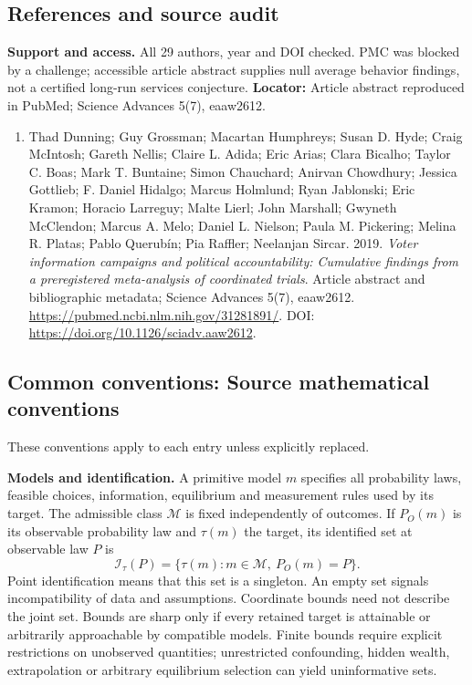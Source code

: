 \documentclass[11pt,a4paper]{article}
\begin{document}
\subsection*{References and source audit}
\textbf{Support and access.} All 29 authors, year and DOI checked. PMC was blocked by a challenge; accessible article abstract supplies null average behavior findings, not a certified long-run services conjecture. \textbf{Locator:} Article abstract reproduced in PubMed; Science Advances 5(7), eaaw2612.
\begin{enumerate}\raggedright
\item\hypertarget{definitions:source:30007669:1}{} Thad Dunning; Guy Grossman; Macartan Humphreys; Susan D. Hyde; Craig McIntosh; Gareth Nellis; Claire L. Adida; Eric Arias; Clara Bicalho; Taylor C. Boas; Mark T. Buntaine; Simon Chauchard; Anirvan Chowdhury; Jessica Gottlieb; F. Daniel Hidalgo; Marcus Holmlund; Ryan Jablonski; Eric Kramon; Horacio Larreguy; Malte Lierl; John Marshall; Gwyneth McClendon; Marcus A. Melo; Daniel L. Nielson; Paula M. Pickering; Melina R. Platas; Pablo Querubín; Pia Raffler; Neelanjan Sircar. 2019. \emph{Voter information campaigns and political accountability: Cumulative findings from a preregistered meta-analysis of coordinated trials}. Article abstract and bibliographic metadata; Science Advances 5(7), eaaw2612.
\url{https://pubmed.ncbi.nlm.nih.gov/31281891/}.
DOI: \url{https://doi.org/10.1126/sciadv.aaw2612}.
\end{enumerate}

\subsection*{Common conventions: Source mathematical conventions}

These conventions apply to each entry unless explicitly replaced.

\textbf{Models and identification.} A primitive model \(m\) specifies all probability laws, feasible choices, information, equilibrium and measurement rules used by its target. The admissible class \(\mathcal M\) is fixed independently of outcomes. If \(P_O(m)\) is its observable probability law and \(\tau(m)\) the target, its identified set at observable law \(P\) is
\[
 \mathcal I_\tau(P)=\{\tau(m):m\in\mathcal M,\ P_O(m)=P\}.
\]
Point identification means that this set is a singleton. An empty set signals incompatibility of data and assumptions. Coordinate bounds need not describe the joint set. Bounds are sharp only if every retained target is attainable or arbitrarily approachable by compatible models. Finite bounds require explicit restrictions on unobserved quantities; unrestricted confounding, hidden wealth, extrapolation or arbitrary equilibrium selection can yield uninformative sets.
\end{document}
